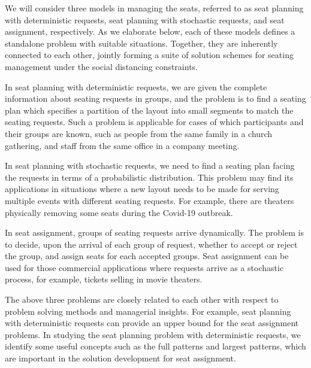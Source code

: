 We will consider three models in managing the seats, referred to as seat planning with deterministic requests, seat planning with stochastic requests, and seat assignment, respectively. As we elaborate below, each of these models defines a standalone problem with suitable situations. Together, they are inherently connected to each other, jointly forming a suite of solution schemes for seating management under the social distancing constraints.

In seat planning with deterministic requests, we are given the complete information about seating requests in groups, and the problem is to find a seating plan which specifies a partition of the layout into small segments to match the seating requests. Such a problem is applicable for cases of which participants and their groups are known, such as people from the same family in a church gathering, and staff from the same office in a company meeting.
 
In seat planning with stochastic requests, we need to find a seating plan facing the requests in terms of a probabilistic distribution. This problem may find its applications in situations where a new layout needs to be made for serving multiple events with different seating requests. For example, there are theaters physically removing some seats during the Covid-19 outbreak. \cite{Berlin_theater}

In seat assignment, groups of seating requests arrive dynamically. The problem is to decide, upon the arrival of each group of request, whether to accept or reject the group, and assign seats for each accepted groups. Seat assignment can be used for those  commercial applications where requests arrive as a stochastic process, for example, tickets selling in movie theaters.

The above three problems are closely related to each other with respect to problem solving methods and managerial insights. For example, seat planning with deterministic requests can provide an upper bound for the seat assignment problems. In studying the seat planning problem with deterministic requests, we identify some useful concepts such as the full patterns and largest patterns, which are important in the solution development for seat assignment.



